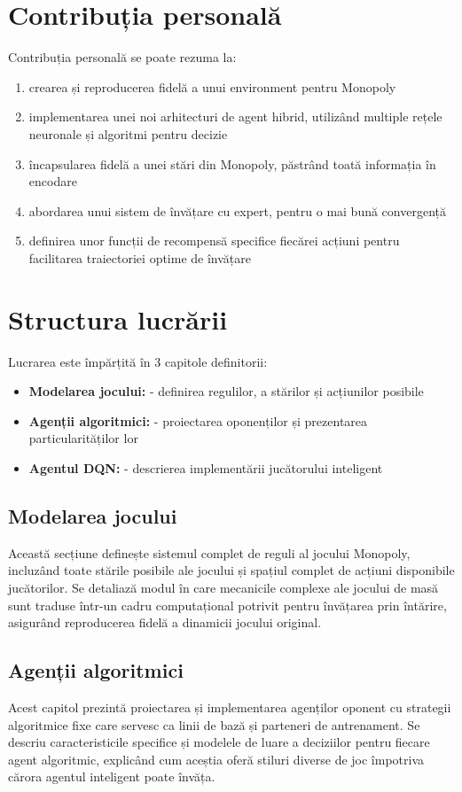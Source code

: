 \section{Contribuția personală}
Contribuția personală se poate rezuma la:
\begin{enumerate}
    \item crearea și reproducerea fidelă a unui environment pentru Monopoly
    \item implementarea unei noi arhitecturi de agent hibrid, utilizând multiple rețele neuronale și algoritmi pentru decizie
    \item încapsularea fidelă a unei stări din Monopoly, păstrând toată informația în encodare
    \item abordarea unui sistem de învățare cu expert, pentru o mai bună convergență
    \item definirea unor funcții de recompensă specifice fiecărei acțiuni pentru facilitarea traiectoriei optime de învățare
\end{enumerate}

\section{Structura lucrării}
Lucrarea este împărțită în 3 capitole definitorii:
\begin{itemize}
    \item \textbf{Modelarea jocului:} - definirea regulilor, a stărilor și acțiunilor posibile
    \item \textbf{Agenții algoritmici:} - proiectarea oponenților și prezentarea particularităților lor
    \item \textbf{Agentul DQN:} - descrierea implementării jucătorului inteligent
\end{itemize}

\subsection{Modelarea jocului}
Această secțiune definește sistemul complet de reguli al jocului Monopoly, incluzând toate stările posibile ale jocului și spațiul complet de acțiuni disponibile jucătorilor. Se detaliază modul în care mecanicile complexe ale jocului de masă sunt traduse într-un cadru computațional potrivit pentru învățarea prin întărire, asigurând reproducerea fidelă a dinamicii jocului original.

\subsection{Agenții algoritmici}
Acest capitol prezintă proiectarea și implementarea agenților oponent cu strategii algoritmice fixe care servesc ca linii de bază și parteneri de antrenament. Se descriu caracteristicile specifice și modelele de luare a deciziilor pentru fiecare agent algoritmic, explicând cum aceștia oferă stiluri diverse de joc împotriva cărora agentul inteligent poate învăța.

